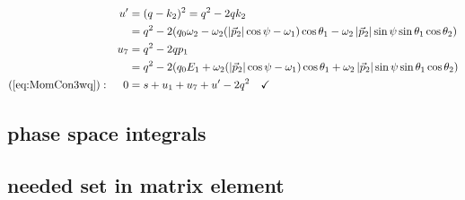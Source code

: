 \begin{align}
&&u' &=(q-k_2)^2 = q^2-2qk_2\\
&& &= q^2-2(q_0\omega_2 -\omega_2(\left|\vec p_2\right|\cos\psi-\omega_1)\cos\theta_1-\omega_2\left|\vec p_2\right|\sin\psi\sin\theta_1\cos\theta_2)\\
&&u_7 &= q^2-2qp_1\\
&& &=q^2 - 2(q_0E_1 +\omega_2(\left|\vec p_2\right|\cos\psi-\omega_1)\cos\theta_1 + \omega_2\left|\vec p_2\right|\sin\psi\sin\theta_1\cos\theta_2)\\
(\ref{eq:MomCon3wq}): &&0 &=s+u_1+u_7+u'-2q^2\quad\checkmark
\end{align}

\subsection{phase space integrals}


\subsection{needed set in matrix element}

